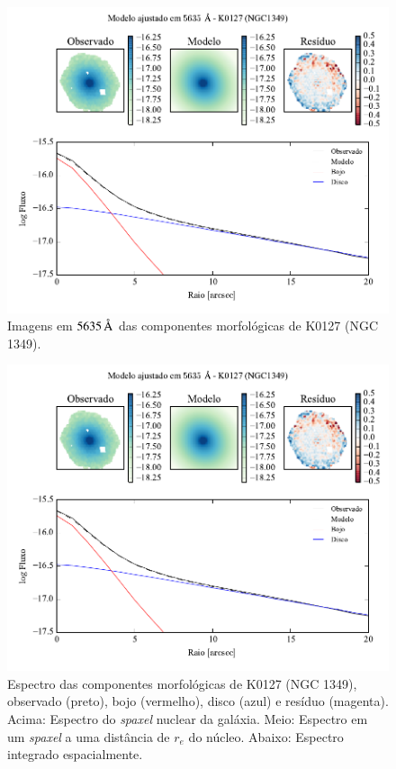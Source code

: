 \begin{figure}
	\includegraphics[page=3]{figuras-decomp/K0127_sample006a}
	\caption[Imagens em $5635\,\angstrom$ das componentes morfológicas de K0127
	(NGC 1349)]
	{Imagens em $5635\,\angstrom$ das componentes morfológicas de K0127
	(NGC 1349).}
	\label{fig:decompImages:K0127}
\end{figure}

\begin{figure}
	\includegraphics[page=4]{figuras-decomp/K0127_sample006a}
	\caption[Espectro das componentes morfológicas de K0127 (NGC 1349)]
	{Espectro das componentes morfológicas de K0127 (NGC 1349),
	observado (preto), bojo (vermelho), disco (azul) e resíduo (magenta). Acima:
	Espectro do {\em spaxel} nuclear da galáxia. Meio: Espectro em um {\em spaxel}
	a uma distância de $r_e$ do núcleo. Abaixo: Espectro integrado espacialmente.}
	\label{fig:decompSpectra:K0127}
\end{figure}

